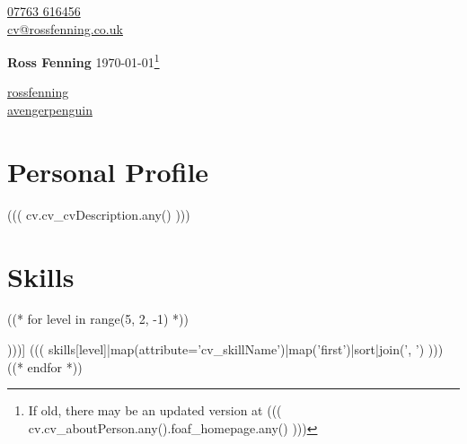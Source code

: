 \documentclass[10pt]{article}
\begin{document}
\begin{multicols}{3}
  \begin{flushleft}
    {\color{icnclr}} \href{tel:+447763616456}{07763 616456} \\
    {\color{icnclr}\faEnvelope[regular]} \href{mailto:cv@rossfenning.co.uk}{cv@rossfenning.co.uk} \\
  \end{flushleft}

\columnbreak

  \begin{center}
      {\huge\bfseries Ross Fenning}
      \today\footnote{If old, there may be an updated version at ((( cv.cv_aboutPerson.any().foaf_homepage.any() )))}
 \end{center}

\columnbreak

  \begin{flushright}
    \href{https://www.linkedin.com/in/rossfenning/}{rossfenning} {\color{icnclr}\faLinkedinIn} \\
    \href{https://github.com/avengerpenguin}{avengerpenguin} {\color{icnclr}\faGithub} \\
  \end{flushright}
\end{multicols}



\section*{Personal Profile}
((( cv.cv_cvDescription.any() )))

\section*{Skills}

\begin{description}
((* for level in range(5, 2, -1) *))
\item[((( skill_levels[level] )))] ((( skills[level]|map(attribute='cv_skillName')|map('first')|sort|join(', ') )))
((* endfor *))
\end{description}
\end{document}
